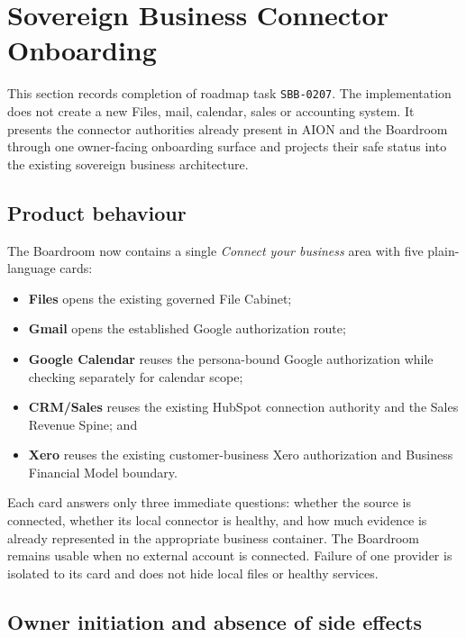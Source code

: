 \section{Sovereign Business Connector Onboarding}
\label{sec:sovereign-business-connectors}

This section records completion of roadmap task \texttt{SBB-0207}.  The
implementation does not create a new Files, mail, calendar, sales or accounting
system.  It presents the connector authorities already present in AION and the
Boardroom through one owner-facing onboarding surface and projects their safe
status into the existing sovereign business architecture.

\subsection{Product behaviour}

The Boardroom now contains a single \emph{Connect your business} area with five
plain-language cards:

\begin{itemize}
  \item \textbf{Files} opens the existing governed File Cabinet;
  \item \textbf{Gmail} opens the established Google authorization route;
  \item \textbf{Google Calendar} reuses the persona-bound Google authorization
        while checking separately for calendar scope;
  \item \textbf{CRM/Sales} reuses the existing HubSpot connection authority and
        the Sales Revenue Spine; and
  \item \textbf{Xero} reuses the existing customer-business Xero authorization
        and Business Financial Model boundary.
\end{itemize}

Each card answers only three immediate questions: whether the source is connected,
whether its local connector is healthy, and how much evidence is already represented
in the appropriate business container.  The Boardroom remains usable when no external
account is connected.  Failure of one provider is isolated to its card and does not
hide local files or healthy services.

\subsection{Owner initiation and absence of side effects}

